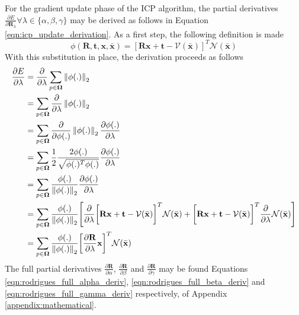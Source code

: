 For the gradient update phase of the ICP algorithm, the partial derivatives
$\frac{\partial E}{\partial \mathbf{R}_{\lambda}} \forall \lambda \in \{\alpha, \beta, \gamma\}$ 
may be derived as follows in Equation \ref{eqn:icp_update_derivation}.
As a first step, the following definition is made
\begin{equation}
  \label{eqn:icp_deriv_sub}
  \phi(\mathbf{R}, \mathbf{t}, \mathbf{x}, \bar{\mathbf{x}}) =
  \left[
    \mathbf{Rx} + \mathbf{t} - \mathcal{V}(\bar{\mathbf{x}})
  \right]^{T}
  \mathcal{N}(\bar{\mathbf{x}})
\end{equation}
With this substitution in place, the derivation proceeds as follows
\begin{align}
  \label{eqn:icp_update_derivation_rot}
  \frac{\partial E}{\partial \lambda} & =
  \frac{\partial}{\partial \lambda}
  \sum_{p \in \mathbf{\Omega}}
  \left\lVert\phi(.)\right\rVert_{2}\\
  & = \sum_{p \in \mathbf{\Omega}}
  \frac{\partial}{\partial \lambda}
  \left\lVert\phi(.)\right\rVert_{2}\\
  & = \sum_{p \in \mathbf{\Omega}}
  \frac{\partial}{\partial \phi(.)} \left\lVert\phi(.)\right\rVert_{2}
  \frac{\partial \phi(.)}{\partial \lambda}\\
  & = \sum_{p \in \mathbf{\Omega}}
  \frac{1}{2}\frac{2 \phi(.)}{\sqrt{\phi(.)^{T}\phi(.)}}
  \frac{\partial \phi(.)}{\partial \lambda}\\
  & = \sum_{p \in \mathbf{\Omega}}
  \frac{\phi(.)}{\left\lVert\phi(.)\right\rVert_{2}}
  \frac{\partial \phi(.)}{\partial \lambda}\\
  & = \sum_{p \in \mathbf{\Omega}}
  \frac{\phi(.)}{\left\lVert\phi(.)\right\rVert_{2}}
  \Bigg[ \frac{\partial}{\partial \lambda}
  \bigg[ \mathbf{Rx} + \mathbf{t} - \mathcal{V}(\bar{\mathbf{x}}) \bigg]^{T}
  \mathcal{N}(\bar{\mathbf{x}}) + 
  \bigg[ \mathbf{Rx} + \mathbf{t} - \mathcal{V}(\bar{\mathbf{x}}) \bigg]^{T}
  \frac{\partial}{\partial \lambda}
  \mathcal{N}(\bar{\mathbf{x}})\Bigg]\\
  & = \sum_{p \in \mathbf{\Omega}}
  \frac{\phi(.)}{\left\lVert\phi(.)\right\rVert_{2}}
  \bigg[ \frac{\partial \mathbf{R}}{\partial \lambda}
  \mathbf{x}\bigg]^{T}
  \mathcal{N}(\bar{\mathbf{x}})
\end{align}
The full partial derivatives $\frac{\partial \mathbf{R}}{\partial \alpha}$,
$\frac{\partial \mathbf{R}}{\partial \beta}$ and
$\frac{\partial \mathbf{R}}{\partial \gamma}$ may be found Equations
\ref{eqn:rodrigues_full_alpha_deriv}, \ref{eqn:rodrigues_full_beta_deriv}
and \ref{eqn:rodrigues_full_gamma_deriv} respectively, of Appendix 
\ref{appendix:mathematical}.

